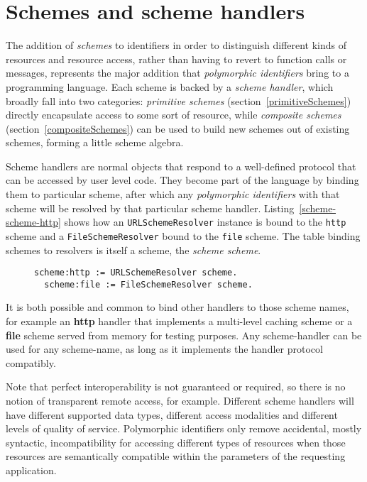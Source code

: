 \documentclass[preprint,authoryear]{acm_proc_article-sp}
\begin{document}
\section{Schemes and scheme handlers}
\label{schemes}
The addition of {\em schemes} to identifiers in order to distinguish different kinds of resources
and resource access, rather than having to revert to function calls or messages, represents
the major addition that {\em polymorphic identifiers} bring to a programming language.
Each scheme is backed by a {\em scheme handler}, which broadly fall into two categories:
 {\em primitive schemes} (section~\ref{primitiveSchemes})
directly encapsulate access to some sort of resource, while {\em composite schemes} (section~\ref{compositeSchemes})
can be used to build new schemes out of existing schemes, forming a little scheme algebra.


Scheme handlers are normal objects that respond to a well-defined protocol that can be
accessed by user level code.  They
become part of the language by binding them to particular scheme, after which
any {\em polymorphic identifiers} with that scheme will be resolved by that particular scheme handler.
Listing~\ref{scheme-scheme-http} shows how an {\tt URLSchemeResolver} instance is bound
to the {\tt http} scheme and a {\tt FileSchemeResolver} bound to the {\tt file} scheme.  The table 
binding schemes to resolvers is itself a scheme, the {\em scheme scheme}.

\begin{figure}[htbp]
\begin{lstlisting}[style=L,label=scheme-scheme-http,caption=Binding scheme handlers to the http and file schemes.]
  scheme:http := URLSchemeResolver scheme.
  scheme:file := FileSchemeResolver scheme.
\end{lstlisting}
\end{figure}

It is both possible and common to bind other handlers to those scheme
names, for example an {\bf http} handler that implements a multi-level caching scheme
or a {\bf file} scheme served from memory for testing purposes.  Any scheme-handler
can be used for any scheme-name, as long as it implements the handler protocol
compatibly.

Note that perfect interoperability is not guaranteed or required, so there is no notion
of transparent remote access, for example.  Different scheme handlers will have different supported
data types, different access modalities and different levels of quality of service.
Polymorphic identifiers only remove accidental, mostly syntactic, incompatibility for accessing different types
of resources when those resources are semantically compatible within the parameters
of the requesting application.
\end{document}
